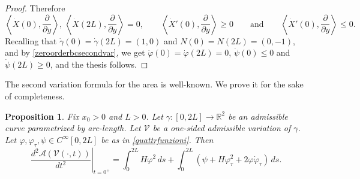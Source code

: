 \documentclass[11pt]{amsart}
\renewcommand{\leq}{\leqslant}
\renewcommand{\geq}{\geqslant}
\newcommand{\A}{\mathcal A}
\newcommand{\rr}{{\mathbb{R}}}
\newtheorem{proposition}[theorem]{Proposition}
\theoremstyle{definition}
\theoremstyle{remark}
\numberwithin{equation}{section}
\begin{document}
\begin{proof}
Therefore
\begin{equation*}
	\left \langle \dot X(0),\frac{\partial}{\partial y}\right\rangle,\,  \left \langle \dot X(2L),\frac{\partial}{\partial y}\right\rangle=0,\qquad   \left \langle \dot X'(0),\frac{\partial}{\partial y}\right\rangle\geq 0\qquad\text{and}\qquad   \left \langle \dot X'(0),\frac{\partial}{\partial y}\right\rangle\leq 0.
\end{equation*}
Recalling that $\dot \gamma(0)=\dot\gamma(2L)=(1,0)$ and $N(0)=N(2L)=(0,-1)$, and by \eqref{zeroorderbcsecondvar}, we get $\dot\varphi(0)=\dot\varphi(2L)=0$, $\dot\psi(0)\leq 0$ and $\dot\psi(2L)\geq 0$, and the thesis follows.
\end{proof}
The second variation formula for the area is well-known. We prove it for the sake of completeness.
\begin{proposition}\label{secvarvolthm}
Fix $x_0>0$ and $L>0$. Let $\gamma:[0,2L]\to\rr^2$ be an admissible curve parametrized by arc-length. Let $\mathcal V$ be a one-sided admissible variation of $\gamma$. Let $\varphi,\varphi_\tau,\psi\in C^\infty[0,2L]$ be as in \eqref{quattrfunzioni}.
Then
\begin{equation}\label{secondvarvol}
	\left.\frac{d^2\A(\mathcal V(\cdot,t))}{dt^2}\right|_{t=0^+}=\int_0^{2L}H\varphi^2\,ds+\int_0^{2L}\left(\psi+H\varphi_\tau^2+2\varphi\dot\varphi_\tau\right)\,ds.
\end{equation}
\end{proposition}
\end{document}
